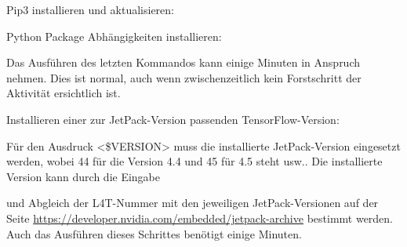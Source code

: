\medskip





\medskip

Pip3 installieren und aktualisieren:


\medskip

Python Package Abhängigkeiten installieren:

\medskip




\medskip

Das Ausführen des letzten Kommandos kann einige Minuten in Anspruch nehmen. Dies ist normal, auch wenn zwischenzeitlich kein Forstschritt der Aktivität ersichtlich ist.

\medskip

Installieren einer zur JetPack-Version passenden TensorFlow-Version:

\medskip




\medskip

Für den Ausdruck <\$VERSION> muss die installierte JetPack-Version eingesetzt werden, wobei 44 für die Version 4.4 und 45 für 4.5 steht usw.. Die installierte Version kann durch die Eingabe

\medskip


\medskip

und Abgleich der L4T-Nummer mit den jeweiligen JetPack-Versionen auf der Seite \url{https://developer.nvidia.com/embedded/jetpack-archive} bestimmt werden.
Auch das Ausführen dieses Schrittes benötigt einige Minuten.




